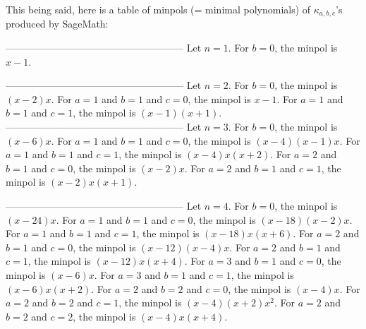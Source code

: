 \documentclass[numbers=enddot,12pt,final,onecolumn,notitlepage]{scrartcl}%
\numberwithin{exer}{subsection}
\theoremstyle{definition}
\begin{document}
This being said, here is a table of minpols (= minimal polynomials) of
$\kappa_{a,b,c}$'s produced by SageMath:

------------------------------------------------------ \newline Let $n=1$.
\newline For $b=0$, the minpol is $x-1$. \newline

------------------------------------------------------ \newline Let $n=2$.
\newline For $b=0$, the minpol is $(x-2)x$. \newline For $a=1$ and $b=1$ and
$c=0$, the minpol is $x-1$. \newline For $a=1$ and $b=1$ and $c=1$, the minpol
is $(x-1)(x+1)$. \newline%
------------------------------------------------------ \newline Let $n=3$.
\newline For $b=0$, the minpol is $(x-6)x$. \newline For $a=1$ and $b=1$ and
$c=0$, the minpol is $(x-4)(x-1)x$. \newline For $a=1$ and $b=1$ and $c=1$,
the minpol is $(x-4)x(x+2)$. \newline For $a=2$ and $b=1$ and $c=0$, the
minpol is $(x-2)x$. \newline For $a=2$ and $b=1$ and $c=1$, the minpol is
$(x-2)x(x+1)$. \newline

------------------------------------------------------ \newline Let $n=4$.
\newline For $b=0$, the minpol is $(x-24)x$. \newline For $a=1$ and $b=1$ and
$c=0$, the minpol is $(x-18)(x-2)x$. \newline For $a=1$ and $b=1$ and $c=1$,
the minpol is $(x-18)x(x+6)$. \newline For $a=2$ and $b=1$ and $c=0$, the
minpol is $(x-12)(x-4)x$. \newline For $a=2$ and $b=1$ and $c=1$, the minpol
is $(x-12)x(x+4)$. \newline For $a=3$ and $b=1$ and $c=0$, the minpol is
$(x-6)x$. \newline For $a=3$ and $b=1$ and $c=1$, the minpol is $(x-6)x(x+2)$.
\newline For $a=2$ and $b=2$ and $c=0$, the minpol is $(x-4)x$. \newline For
$a=2$ and $b=2$ and $c=1$, the minpol is $(x-4)(x+2)x^{2}$. \newline For $a=2$
and $b=2$ and $c=2$, the minpol is $(x-4)x(x+4)$. \newline
\end{document}
